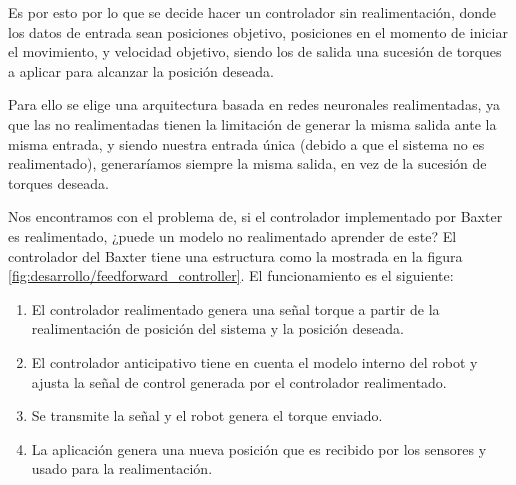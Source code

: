 Es por esto por lo que se decide hacer un controlador sin realimentación, donde los datos de entrada sean posiciones objetivo, posiciones en el momento de iniciar el movimiento, y velocidad objetivo, siendo los de salida una sucesión de torques a aplicar para alcanzar la posición deseada.

Para ello se elige una arquitectura basada en redes neuronales realimentadas, ya que las no realimentadas tienen la limitación de generar la misma salida ante la misma entrada, y siendo nuestra entrada única (debido a que el sistema no es realimentado), generaríamos siempre la misma salida, en vez de la sucesión de torques deseada.

Nos encontramos con el problema de, si el controlador implementado por Baxter es realimentado, ¿puede un modelo no realimentado aprender de este? %
El controlador del Baxter tiene una estructura como la mostrada en la figura \ref{fig:desarrollo/feedforward_controller}. El funcionamiento es el siguiente:

\begin{enumerate}
\item El controlador realimentado genera una señal torque a partir de la realimentación de posición del sistema y la posición deseada.
\item El controlador anticipativo tiene en cuenta el modelo interno del robot y ajusta la señal de control generada por el controlador realimentado.
\item Se transmite la señal y el robot genera el torque enviado.
\item La aplicación genera una nueva posición que es recibido por los sensores y usado para la realimentación.
\end{enumerate}

